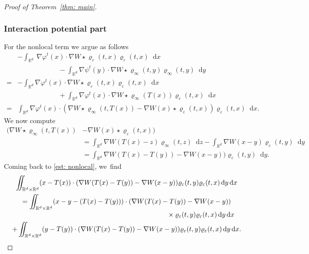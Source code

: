 \documentclass[11pt]{article}
\numberwithin{equation}{section}
\newcommand{\dx}[1]{\mathop{}\!\mathrm{d} #1}
\newcommand{\R}{\mathbb{R}}
\theoremstyle{plain}
\theoremstyle{remark}
\begin{document}
\begin{proof}[Proof of Theorem~\ref{thm: main}]
\subsubsection*{Interaction potential part}
For the nonlocal term we argue as follows\vspace*{-3pt}
\begin{equation}\label{est: nonlocal}
\begin{split}
&- \int_{\R^d}\!\ \nabla \varphi^t (x) \cdot \nabla W\star \varrho_\varepsilon (t,x) \varrho_\varepsilon(t,x) \dx x\\
&\qquad\qquad\qquad - \int_{\R^d} \nabla \psi^t (y) \cdot \nabla W\star \varrho_\infty (t,y) \varrho_\infty(t,y) \dx y\\
=&- \int_{\R^d} \nabla \varphi^t (x) \cdot \nabla W\star \varrho_\varepsilon (t,x) \varrho_\varepsilon(t,x) \dx x\\[0.2em]
&\qquad\qquad\qquad+ \int_{\R^d} \nabla \varphi^t (x) \cdot \nabla W\star \varrho_\infty (T(x)) \varrho_\varepsilon(t,x) \dx x\\
=&\int_{\R^d} \nabla \varphi^t (x) \cdot (\nabla W\star \varrho_\infty (t,T(x)) - \nabla W(x) \star\varrho_\varepsilon(t,x)) \varrho_\varepsilon(t,x) \dx x.
\end{split}
\end{equation}
We now compute
\begin{equation*}
\begin{aligned}
(\nabla W\star \varrho_\infty (t,T(x)) &- \nabla W(x) \star\varrho_\varepsilon(t,x))\\
&= \int_{\R^d} \nabla W(T(x)-z) \varrho_\infty(t,z) \dx z - \int_{\R^d} \nabla W(x-y) \varrho_\varepsilon(t,y) \dx y\\
&= \int_{\R^d} \nabla W(T(x)-T(y)) - \nabla W(x-y) )\varrho_\varepsilon(t,y) \dx y.
\end{aligned}
\end{equation*}
Coming back to \eqref{est: nonlocal}, we~find\vspace*{-5pt}
\begin{multline*}
\iint_{\R^d\times\R^d} (x- T(x))\cdot (\nabla W(T(x)-T(y)) - \nabla W(x-y)) \varrho_\varepsilon(t,y) \varrho_\varepsilon(t,x) \dx y \dx x\\
=\iint_{\R^d\times\R^d} (x-y - (T(x)-T(y)))\cdot (\nabla W(T(x)-T(y)) - \nabla W(x-y))\\[-3pt]
\shoveright{{}\times \varrho_\varepsilon(t,y) \varrho_\varepsilon(t,x) \dx y \dx x}\\
+ \iint_{\R^d\times\R^d} (y -T(y))\cdot (\nabla W(T(x)-T(y)) - \nabla W(x-y)) \varrho_\varepsilon(t,y) \varrho_\varepsilon(t,x) \dx y \dx x.

\end{multline*}
\end{proof}
\end{document}
